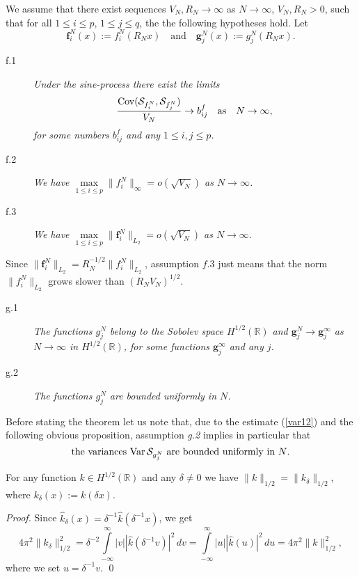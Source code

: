 \documentclass{article}
\numberwithin{equation}{section}
\newcommand{\mR}{\mathbb{R}}
\newcommand{\SSS}{{\cal S}}
\newcommand{\de}{\delta}
\newcommand{\Cov}{\operatorname{Cov}}
\newcommand{\Var}{\operatorname{Var}}
\newcommand{\ssk}{\smallskip}
\newcommand{\ra}{\rightarrow}
\newcommand{\fr}{\frac}
\newcommand{\qmb}{\quad\mbox}
\newcommand{\qu}{\quad}
\newcommand{\ili}{\int\limits}
\newcommand{\ilif}{\ili_{-\infty}^\infty}
\newcommand{\lbl}{\label}
\newcommand{\ass}{\quad\mbox{as}\quad}
\newcommand{\bee}{\begin{equation}}
\newcommand{\eee}{\end{equation}}
\newcommand{\bpp}{\begin{prop}}
\newcommand{\epp}{\end{prop}}
\begin{document}
We assume that
there exist sequences $V_N, R_N\ra\infty$ as $N\ra\infty$,
$V_N,R_N>0$,
such that  for all $1\leq i \leq p$, $1\leq j\leq q$,
the the following hypotheses hold.
Let
\bee\lbl{boldg}
\bm f^N_i(x):=f^N_i(R_Nx) \qmb{and}\qu \bm g^N_j(x):=g^N_j(R_Nx).
\eee
\begin{description}
\item[f.1] \emph{Under the sine-process there exist the limits}
\bee\lbl{jconvbf}
\fr{\Cov (\SSS_{f^N_i},\SSS_{f^N_j})}{V_N}\ra b^f_{ij} \ass N\ra\infty,
\eee
\emph{for some numbers $b^f_{ij}$ and any $1\leq i,j\leq p$.}

\item[f.2] \emph{We have $\max\limits_{1\leq i\leq p}\|f_i^N\|_\infty = o(\sqrt{V_N})$ as $N\ra\infty$.}

\item[f.3]
\emph{We have $\max\limits_{1\leq i\leq p}\|\bm f^N_i\|_{L_2}=o(\sqrt{V_N})$ as $N\ra\infty$}.
\end{description}
Since 
$\|\bm f^N_i\|_{L_2}=R_N^{-1/2}\|f_i^N\|_{L_2}$, 
assumption $f.3$ just means that the norm $\|f_i^N\|_{L_2}$ 
grows slower than $(R_NV_N)^{1/2}$.
\begin{description}
\item[g.1]
\emph{The functions $g_j^N$ belong to the Sobolev space
$H^{1/2}(\mR)$
and $\bm g_j^N\ra \bm g_j^\infty$ as $N\ra\infty$ in $H^{1/2}(\mR)$,
for some functions $\bm g_j^\infty$ and any $j$. }

\item[g.2]
\emph{The functions $g_j^N$ are bounded uniformly in $N$. }

\end{description}
Before stating the theorem let us note that, due to the estimate (\ref{var12})
and the following obvious proposition,
assumption \emph{g.2} implies in particular that
\bee\lbl{Var<C}
\mbox{the variances $\Var\SSS_{g_j^N}$ are bounded uniformly in $N$.}
\eee


\bpp\lbl{lem:g1/2}
For any function $k\in H^{1/2}(\mR)$ and any $\de\neq 0$ we have
$\|k\|_{1/2}=\|k_\delta\|_{1/2}$,
where $k_\de(x):=k(\de x).$
\epp
\emph{Proof.}
Since $\hat k_\de(x)=\de^{-1}\hat k(\de^{-1} x)$,
we get
$$
4\pi^2 \|k_\delta\|_{1/2}^2  = \de^{-2}\ilif|v||\hat k (\de^{-1}v)|^2\, dv
=\ilif|u||\hat k (u)|^2\, du=4\pi^2\|k\|_{1/2}^2,
$$
where we set $u=\de^{-1}v$.
\qed


\ssk
\end{document}
